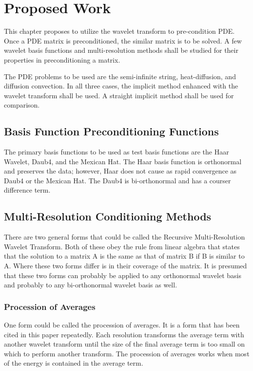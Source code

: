\section {Proposed Work}
This chapter proposes to utilize the wavelet transform to pre-condition PDE.  Once a PDE matrix is preconditioned,  the similar matrix is to be solved.  A few wavelet basis functions and multi-resolution methods shall be studied for their properties in preconditioning a matrix.  

The PDE problems to be used are the semi-infinite string, heat-diffusion, and diffusion convection.    In all three cases, the implicit method enhanced with the wavelet transform shall be used.  A straight implicit method shall be used for comparison.  

\subsection {Basis Function Preconditioning Functions}
The primary basis functions to be used as test basis functions are the Haar Wavelet, Daub4, and the Mexican Hat.  The Haar basis function is orthonormal and preserves the data; however, Haar does not cause as rapid convergence as Daub4 or the Mexican Hat.  The Daub4 is bi-orthonormal and has a courser difference term.  %

\subsection {Multi-Resolution Conditioning Methods}
There are two general forms that could be called the Recursive Multi-Resolution Wavelet Transform.  Both of these obey the rule from linear algebra that states that the solution to a matrix A is the same as that of matrix B if B is similar to A.   Where these two forms differ is in their coverage of the matrix.  It is presumed that these two forms can probably be applied to any orthonormal wavelet basis and probably to any bi-orthonormal wavelet basis as well.  

\subsubsection {Procession of Averages}
One form could be called the procession of averages.  It is a form that has been cited in this paper repeatedly.   Each resolution transforms the average term with another wavelet transform until the size of the final average term is too small on which to perform another transform.  %
The procession of averages works when most of the energy is contained in the average term.

